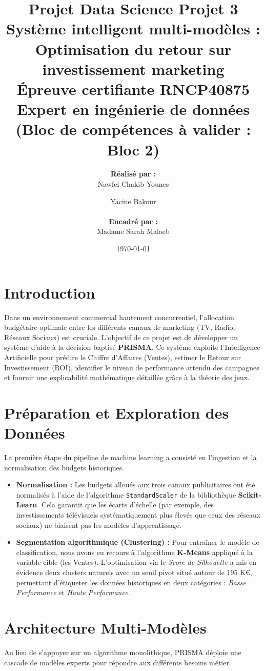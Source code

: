 \documentclass[a4paper,12pt]{article}
\title{
    \vspace{-2cm}
    \textbf{Projet Data Science Projet 3} \\
    \Large Système intelligent multi-modèles : Optimisation du retour sur investissement marketing \\
    \vspace{0.5cm}
    \large Épreuve certifiante RNCP40875 Expert en ingénierie de données (Bloc de compétences à valider : Bloc 2)
}
\author{
    \textbf{Réalisé par :} \\
    Nawfel Chakib Younes \and Yacine Bakour \\
    \vspace{1cm}
    \\
    \textbf{Encadré par :} \\
    Madame Sarah Malaeb
}
\date{\today}
\begin{document}
\maketitle
\newpage

\tableofcontents
\newpage

\section{Introduction}
Dans un environnement commercial hautement concurrentiel, l'allocation budgétaire optimale entre les différents canaux de marketing (TV, Radio, Réseaux Sociaux) est cruciale. L'objectif de ce projet est de développer un système d'aide à la décision baptisé \textbf{PRISMA}. Ce système exploite l'Intelligence Artificielle pour prédire le Chiffre d'Affaires (Ventes), estimer le Retour sur Investissement (ROI), identifier le niveau de performance attendu des campagnes et fournir une explicabilité mathématique détaillée grâce à la théorie des jeux.

\section{Préparation et Exploration des Données}
La première étape du pipeline de machine learning a consisté en l'ingestion et la normalisation des budgets historiques.
\begin{itemize}
    \item \textbf{Normalisation :} Les budgets alloués aux trois canaux publicitaires ont été normalisés à l'aide de l'algorithme \texttt{StandardScaler} de la bibliothèque \textbf{Scikit-Learn}. Cela garantit que les écarts d'échelle (par exemple, des investissements télévisuels systématiquement plus élevés que ceux des réseaux sociaux) ne biaisent pas les modèles d'apprentissage.
    \item \textbf{Segmentation algorithmique (Clustering) :} Pour entraîner le modèle de classification, nous avons eu recours à l'algorithme \textbf{K-Means} appliqué à la variable cible (les Ventes). L'optimisation via le \textit{Score de Silhouette} a mis en évidence deux clusters naturels avec un seuil pivot situé autour de 195 K€, permettant d'étiqueter les données historiques en deux catégories : \textit{Basse Performance} et \textit{Haute Performance}.
\end{itemize}

\section{Architecture Multi-Modèles}
Au lieu de s'appuyer sur un algorithme monolithique, PRISMA déploie une cascade de modèles experts pour répondre aux différents besoins métier.
\end{document}
